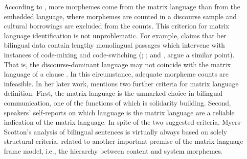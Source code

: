According to \citet[68]{myers-scotton-duelling-1993}, more morphemes come from the matrix language than from the embedded language, where morphemes are counted in a discourse sample and cultural borrowings are excluded from the counts. This criterion for matrix language identification is not unproblematic. For example, \citet[19]{muhamedowa-untersuchung-2006} claims that her bilingual data contain lengthy monolingual passages which intervene with instances of code-mixing and code-switching (\citealt[102]{haust-codeswitching-1995}; \citealt[154]{boumans-syntax-1998}; and \citealt[196]{hlavac-second-generation-2003}, argue a similar point). That is, the discourse-dominant language may not coincide with the matrix language of a clause \citep[cf.][]{heller-conversation-1988}. In this circumstance, adequate morpheme counts are infeasible. In her later work, \citet[237]{milroy-lexically-1995} mentions two further criteria for matrix language definition. First, the matrix language is the unmarked choice in bilingual communication, one of the functions of which is solidarity building. Second, speakers' self-reports on which language is the matrix language are a reliable indication of the matrix language. In spite of the two suggested criteria, Myers-Scotton's analysis of bilingual sentences is virtually always based on solely structural criteria, related to another important premise of the matrix language frame model, i.e., the hierarchy between content and system morphemes.

